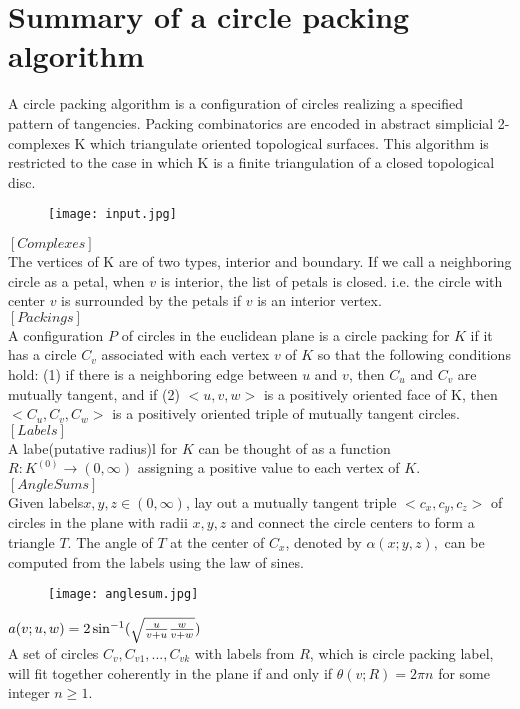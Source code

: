\documentclass{SOP_KimMoran}
\begin{document}
\section{Summary of a circle packing algorithm}
  A circle packing algorithm is a configuration of circles realizing a specified pattern of tangencies. Packing combinatorics are encoded in abstract simplicial 2-complexes K which triangulate oriented topological surfaces. This algorithm is restricted to the case in which K is a finite triangulation of a closed topological disc. \\
\begin{figure}[H]
  \texttt{[image: input.jpg]}
\end{figure}
$[Complexes]$\\
The vertices of K are of two types, interior and boundary. If we call a neighboring circle as a petal, when $v$ is interior, the list of petals is closed. i.e. the circle with center $v$ is surrounded by the petals if $v$ is an interior vertex.\bigskip \\
$[Packings]$\\
A configuration $P$ of circles in the euclidean plane is a circle packing for $K$ if it has a circle $C_v$ associated with each vertex $v$ of $K$ so that the following conditions hold: (1) if there is a neighboring  edge between $u$ and $v$, then $C_u$ and $C_v$ are mutually tangent, and if (2) $<u,v,w>$ is a positively oriented face of K, then $<C_u,C_v,C_w>$ is a positively oriented triple of mutually tangent circles.\bigskip \\
$[Labels]$\\
A labe(putative radius)l for $K$ can be thought of as a function $R:K^{(0)}\to(0,\infty)
$ assigning a positive value to each vertex of $K$.\bigskip \\
$[Angle Sums]$\\
Given labels$x,y,z\in(0,\infty)$, lay out a mutually tangent triple $<c_x,c_y,c_z>$ of circles in the plane with radii $x,y,z$ and connect the circle centers to form a triangle $T$. The angle of $T$ at the center of $C_x$, denoted by $\alpha(x;y,z),$ can be computed from the labels using the law of sines.
\begin{figure}[H]
  \texttt{[image: anglesum.jpg]}
\end{figure}
$a(v;u,w)=2\sin^{\small -1}(\sqrt{\frac{u}{v+u}\frac{w}{v+w}})$\\
A set of circles $C_v, C_{v1}, ..., C_{vk}$ with labels from $R$, which is circle packing label, will fit together coherently in the plane if and only if $\theta(v;R)=2\pi n$ for some integer $n\geq 1.$\\
\end{document}

